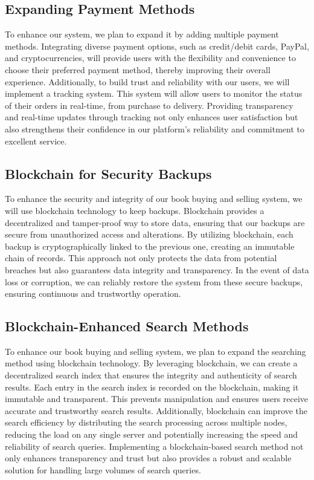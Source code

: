 \documentclass{article}
\begin{document}
\subsection{Expanding Payment Methods}

To enhance our system, we plan to expand it by adding multiple payment methods. Integrating diverse payment options, such as credit/debit cards, PayPal, and cryptocurrencies, will provide users with the flexibility and convenience to choose their preferred payment method, thereby improving their overall experience. Additionally, to build trust and reliability with our users, we will implement a tracking system. This system will allow users to monitor the status of their orders in real-time, from purchase to delivery. Providing transparency and real-time updates through tracking not only enhances user satisfaction but also strengthens their confidence in our platform's reliability and commitment to excellent service.

\subsection{Blockchain for Security Backups}

To enhance the security and integrity of our book buying and selling system, we will use blockchain technology to keep backups. Blockchain provides a decentralized and tamper-proof way to store data, ensuring that our backups are secure from unauthorized access and alterations. By utilizing blockchain, each backup is cryptographically linked to the previous one, creating an immutable chain of records. This approach not only protects the data from potential breaches but also guarantees data integrity and transparency. In the event of data loss or corruption, we can reliably restore the system from these secure backups, ensuring continuous and trustworthy operation.

\subsection{Blockchain-Enhanced Search Methods}

To enhance our book buying and selling system, we plan to expand the searching method using blockchain technology. By leveraging blockchain, we can create a decentralized search index that ensures the integrity and authenticity of search results. Each entry in the search index is recorded on the blockchain, making it immutable and transparent. This prevents manipulation and ensures users receive accurate and trustworthy search results. Additionally, blockchain can improve the search efficiency by distributing the search processing across multiple nodes, reducing the load on any single server and potentially increasing the speed and reliability of search queries. Implementing a blockchain-based search method not only enhances transparency and trust but also provides a robust and scalable solution for handling large volumes of search queries.
\end{document}
